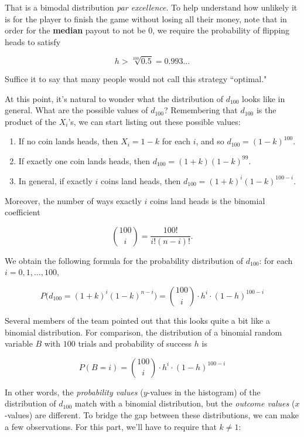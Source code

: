 \documentclass[12pt, oneside]{book}
\theoremstyle{plain}
\theoremstyle{definition}
\begin{document}
\noindent That is a bimodal distribution \textit{par excellence}. To help understand how unlikely it is for the player to finish the game without losing all their money, note that in order for the \textbf{median} payout to not be $0$, we require the probability of flipping heads to satisfy

\[
h > \sqrt[100]{0.5} = 0.993...
\]

\noindent Suffice it to say that many people would not call this strategy ``optimal."

At this point, it's natural to wonder what the distribution of $d_{100}$ looks like in general. What are the possible values of $d_{100}$? Remembering that $d_{100}$ is the product of the $X_i$'s, we can start listing out these possible values:

\begin{enumerate}
\item If no coin lands heads, then $X_i=1-k$ for each $i$, and so $d_{100} = (1-k)^{100}$. 
\item If exactly one coin lands heads, then $d_{100} = (1+k)(1-k)^{99}$.
\item In general, if exactly $i$ coins land heads, then $d_{100} = (1+k)^i (1-k)^{100-i}$.
\end{enumerate}

\noindent Moreover, the number of ways exactly $i$ coins land heads is the binomial coefficient

\[
\binom{100}{i} = \frac{100!}{i!(n-i)!}.
\]

\noindent We obtain the following formula for the probability distribution of $d_{100}$: for each $i=0, 1, \ldots, 100$,

\begin{equation}\label{eqn:dist1}
P \Big (d_{100}=(1+k)^i(1-k)^{n-i} \Big ) = \binom{100}{i} \cdot h^i \cdot (1-h)^{100-i}
\end{equation}

Several members of the team pointed out that this looks quite a bit like a binomial distribution. For comparison, the distribution of a binomial random variable $B$ with $100$ trials and probability of success $h$ is

\[
P(B=i) = \binom{100}{i} \cdot h^i \cdot (1-h)^{100-i}
\]

\noindent In other words, the \textit{probability values} ($y$-values in the histogram) of the distribution of $d_{100}$ match with a binomial distribution, but the \textit{outcome values} ($x$-values) are different. To bridge the gap between these distributions, we can make a few observations. For this part, we'll have to require that $k \neq 1$:
\end{document}
